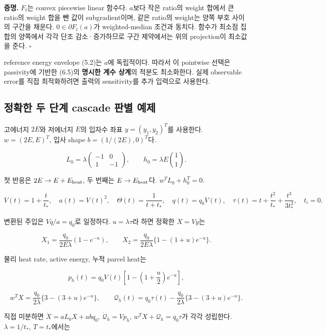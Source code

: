 \documentclass[11pt,a4paper]{article}
\begin{document}
\textbf{증명.} \(F_t\)는 convex piecewise linear 함수다. \(a\)보다 작은 ratio의 weight 합에서 큰 ratio의 weight 합을 뺀 값이 subgradient이며, 같은 ratio의 weight는 양쪽 부호 사이의 구간을 채운다. \(0\in\partial F_t(a)\)가 weighted-median 조건과 동치다. 함수가 최소점 집합의 양쪽에서 각각 단조 감소·증가하므로 구간 제약에서는 위의 projection이 최소값을 준다. \(\square\)

reference energy envelope (5.2)는 \(a\)에 독립적이다. 따라서 이 pointwise 선택은 passivity에 기반한 (6.5)의 \textbf{명시한 계수 상계}의 적분도 최소화한다. 실제 observable error를 직접 최적화하려면 출력의 sensitivity를 추가 입력으로 사용한다.

\hypertarget{uxc815uxd655uxd55c-uxb450-uxb2e8uxacc4-cascade-uxd310uxbcc4-uxc608uxc81c}{%
\subsection{정확한 두 단계 cascade 판별 예제}\label{uxc815uxd655uxd55c-uxb450-uxb2e8uxacc4-cascade-uxd310uxbcc4-uxc608uxc81c}}

고에너지 \(2E\)와 저에너지 \(E\)의 입자수 좌표 \(y=(y_1,y_2)^T\)를 사용한다. \(w=(2E,E)^T\), 입사 shape \(b=(1/(2E),0)^T\)다.

\[
L_0=\lambda
\begin{pmatrix}-1&0\\1&-1\end{pmatrix},
\qquad
h_0=\lambda E\binom11.
\tag{8.1}
\]

첫 반응은 \(2E\to E+E_{\rm heat}\), 두 번째는 \(E\to E_{\rm heat}\)다. \(w^TL_0+h_0^T=0\).

\[
V(t)=1+\frac{t}{t_*},\quad a(t)=V(t)^2,\quad
\Theta(t)=\frac1{t+t_*},\quad
q(t)=q_0V(t),\quad
\tau(t)=t+\frac{t^2}{t_*}+\frac{t^3}{3t_*^2},\quad t_i=0.
\tag{8.2}
\]

변환된 주입은 \(Vq/a=q_0\)로 일정하다. \(u=\lambda\tau\)라 하면 정확한 \(X=Vy\)는

\[
X_1=\frac{q_0}{2E\lambda}(1-e^{-u}),\qquad
X_2=\frac{q_0}{2E\lambda}\{1-(1+u)e^{-u}\}.
\tag{8.3}
\]

물리 heat rate, active energy, 누적 parcel heat는

\[
\boxed{
p_h(t)=q_0V(t)\left[1-\left(1+\frac u2\right)e^{-u}\right],
}
\tag{8.4}
\]

\[
w^TX=
\frac{q_0}{2\lambda}\{3-(3+u)e^{-u}\},
\qquad
\boxed{
\mathcal Q_h(t)
=q_0\tau(t)-\frac{q_0}{2\lambda}\{3-(3+u)e^{-u}\}.
}
\tag{8.5}
\]

직접 미분하면 \(\dot X=aL_0X+abq_0\), \(\dot{\mathcal Q}_h=Vp_h\), \(w^TX+\mathcal Q_h=q_0\tau\)가 각각 성립한다. \(\lambda=1/t_*\), \(T=t_*\)에서는
\end{document}
